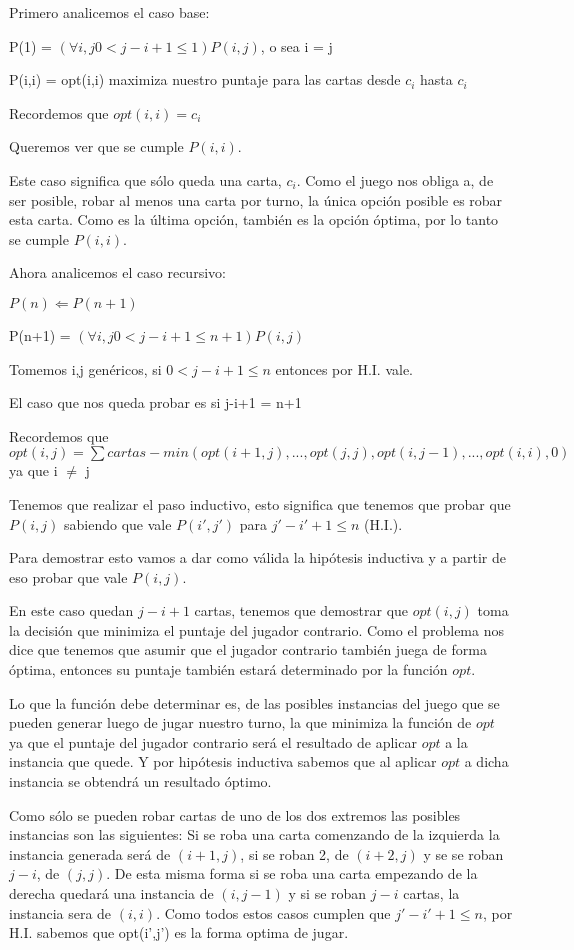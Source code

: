 Primero analicemos el caso base:

P(1) = $(\forall i,j 0 < j -i + 1 \leq 1) P(i,j)$, o sea i = j

P(i,i) = opt(i,i) maximiza nuestro puntaje para las cartas desde $c_i$ hasta $c_i$

Recordemos que $opt(i,i) = c_i$

Queremos ver que se cumple $P(i,i)$.

Este caso significa que sólo queda una carta, $c_i$. Como el juego nos obliga a, de ser posible, robar al menos una carta por turno, la única opción posible es robar esta carta. Como es la última opción, también es la opción óptima, por lo tanto se cumple $P(i,i)$.

Ahora analicemos el caso recursivo:

$ P(n) \Leftarrow P(n+1)$

P(n+1) = $(\forall i,j 0 < j -i + 1 \leq n+1) P(i,j)$

Tomemos i,j genéricos, si $0 < j-i+1 \leq n$ entonces por H.I. vale.

El caso que nos queda probar es si j-i+1 = n+1

Recordemos que $opt(i,j) = \sum cartas - min(opt(i+1, j), ..., opt(j,j), opt(i, j-1), ... ,opt(i,i), 0)$ ya que i $\neq$ j

Tenemos que realizar el paso inductivo, esto significa que tenemos que probar que $P(i,j)$ sabiendo que vale $P(i',j')$ para $j' - i' + 1 \leq n$ (H.I.).

Para demostrar esto vamos a dar como válida la hipótesis inductiva y a partir de eso probar que vale $P(i,j)$.

En este caso quedan $j-i+1$ cartas, tenemos que demostrar que $opt(i,j)$ toma la decisión que minimiza el puntaje del jugador contrario. Como el problema nos dice que tenemos que asumir que el jugador contrario también juega de forma óptima, entonces su puntaje también estará determinado por la función $opt$.

Lo que la función debe determinar es, de las posibles instancias del juego que se pueden generar luego de jugar nuestro turno, la que minimiza la función de $opt$ ya que el puntaje del jugador contrario será el resultado de aplicar $opt$ a la instancia que quede. Y por hipótesis inductiva sabemos que al aplicar $opt$ a dicha instancia se obtendrá un resultado óptimo.

Como sólo se pueden robar cartas de uno de los dos extremos las posibles instancias son las siguientes: Si se roba una carta comenzando de la izquierda la instancia generada será de $(i+1,j)$, si se roban 2, de $(i+2,j)$ y se se roban $j-i$, de $(j,j)$. De esta misma forma si se roba una carta empezando de la derecha quedará una instancia de $(i,j-1)$ y si se roban $j-i$ cartas, la instancia sera de $(i,i)$. Como todos estos casos cumplen que $j' - i' + 1 \leq n$, por H.I. sabemos que opt(i',j') es la forma optima de jugar.

